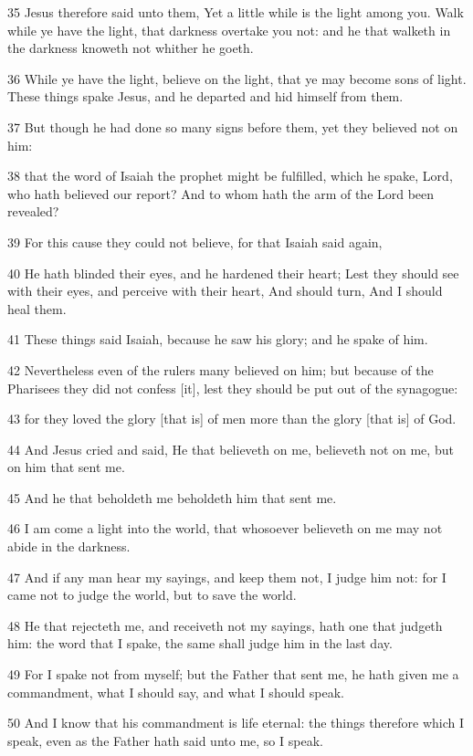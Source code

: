 \par 35 Jesus therefore said unto them, Yet a little while is the light among you. Walk while ye have the light, that darkness overtake you not: and he that walketh in the darkness knoweth not whither he goeth.
\par 36 While ye have the light, believe on the light, that ye may become sons of light. These things spake Jesus, and he departed and hid himself from them.
\par 37 But though he had done so many signs before them, yet they believed not on him:
\par 38 that the word of Isaiah the prophet might be fulfilled, which he spake, Lord, who hath believed our report? And to whom hath the arm of the Lord been revealed?
\par 39 For this cause they could not believe, for that Isaiah said again,
\par 40 He hath blinded their eyes, and he hardened their heart; Lest they should see with their eyes, and perceive with their heart, And should turn, And I should heal them.
\par 41 These things said Isaiah, because he saw his glory; and he spake of him.
\par 42 Nevertheless even of the rulers many believed on him; but because of the Pharisees they did not confess [it], lest they should be put out of the synagogue:
\par 43 for they loved the glory [that is] of men more than the glory [that is] of God.
\par 44 And Jesus cried and said, He that believeth on me, believeth not on me, but on him that sent me.
\par 45 And he that beholdeth me beholdeth him that sent me.
\par 46 I am come a light into the world, that whosoever believeth on me may not abide in the darkness.
\par 47 And if any man hear my sayings, and keep them not, I judge him not: for I came not to judge the world, but to save the world.
\par 48 He that rejecteth me, and receiveth not my sayings, hath one that judgeth him: the word that I spake, the same shall judge him in the last day.
\par 49 For I spake not from myself; but the Father that sent me, he hath given me a commandment, what I should say, and what I should speak.
\par 50 And I know that his commandment is life eternal: the things therefore which I speak, even as the Father hath said unto me, so I speak.

